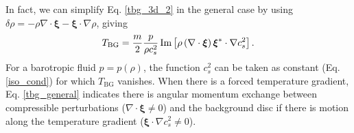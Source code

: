 In fact, we can simplify Eq. \ref{tbg_3d_2} in the general case by
using $\delta\rho = - \rho\nabla\cdot\bm{\xi} -
\bm{\xi}\cdot\nabla\rho$, giving
\begin{align}\label{tbg_general}
  T_\mathrm{BG} = \frac{m}{2}\frac{p}{\rho
    c_s^2}\operatorname{Im}\left[\rho\left(\nabla\cdot\bm{\xi}\right)\bm{\xi}^*\cdot\nabla
  c_s^2\right].  
\end{align} 
For a barotropic fluid $p=p(\rho)$, the function $c_s^2$ can be
taken as constant (Eq. \ref{iso_cond}) for which $T_\mathrm{BG}$
vanishes. When there is a forced temperature gradient,
Eq. \ref{tbg_general} indicates there is angular momentum exchange
between compressible perturbations ($\nabla\cdot\bm{\xi}\neq0$) and
the background disc if there is motion along the temperature
gradient ($\bm{\xi}\cdot\nabla c_s^2 \neq 0$).  



